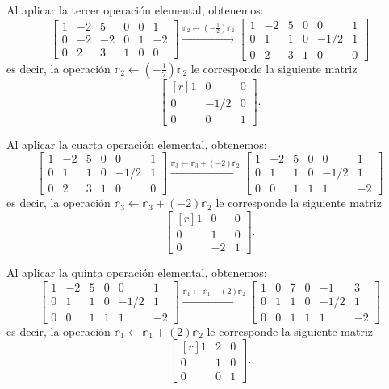 Al aplicar la tercer operación elemental, obtenemos:
$$\left[ \begin{array}{rrr|rrr}
    1 & -2 & 5 & 0 & 0 & 1 \\
    0 & -2 & -2 & 0 & 1 & -2 \\
    0 & 2 & 3 & 1 & 0 & 0
\end{array} \right] \xrightarrow{\mathbb{r}_2 \leftarrow (-\frac{1}{2}) \mathbb{r}_2} \left[ \begin{array}{rrr|rrr}
    1 & -2 & 5 & 0 & 0 & 1 \\
    0 & 1 & 1 & 0 & -1/2 & 1 \\
    0 & 2 & 3 & 1 & 0 & 0
\end{array} \right]$$
es decir, la operación $\mathbb{r}_2 \leftarrow (-\frac{1}{2}) \mathbb{r}_2$ le corresponde la siguiente matriz
$$\begin{bmatrix*}[r]
    1 & 0 & 0 \\
    0 & -1/2 & 0 \\
    0 & 0 & 1
\end{bmatrix*}.$$

Al aplicar la cuarta operación elemental, obtenemos:
$$\left[ \begin{array}{rrr|rrr}
    1 & -2 & 5 & 0 & 0 & 1 \\
    0 & 1 & 1 & 0 & -1/2 & 1 \\
    0 & 2 & 3 & 1 & 0 & 0
\end{array} \right] \xrightarrow{\mathbb{r}_3 \leftarrow \mathbb{r}_3 + (-2) \mathbb{r}_2} \left[ \begin{array}{rrr|rrr}
    1 & -2 & 5 & 0 & 0 & 1 \\
    0 & 1 & 1 & 0 & -1/2 & 1 \\
    0 & 0 & 1 & 1 & 1 & -2
\end{array} \right]$$
es decir, la operación $\mathbb{r}_3 \leftarrow \mathbb{r}_3 + (-2) \mathbb{r}_2$ le corresponde la siguiente matriz
$$\begin{bmatrix*}[r]
    1 & 0 & 0 \\
    0 & 1 & 0 \\
    0 & -2 & 1
\end{bmatrix*}.$$

Al aplicar la quinta operación elemental, obtenemos:
$$\left[ \begin{array}{rrr|rrr}
    1 & -2 & 5 & 0 & 0 & 1 \\
    0 & 1 & 1 & 0 & -1/2 & 1 \\
    0 & 0 & 1 & 1 & 1 & -2
\end{array} \right] \xrightarrow{\mathbb{r}_1 \leftarrow \mathbb{r}_1 + (2) \mathbb{r}_2} \left[ \begin{array}{rrr|rrr}
    1 & 0 & 7 & 0 & -1 & 3 \\
    0 & 1 & 1 & 0 & -1/2 & 1 \\
    0 & 0 & 1 & 1 & 1 & -2
\end{array} \right]$$
es decir, la operación $\mathbb{r}_1 \leftarrow \mathbb{r}_1 + (2) \mathbb{r}_2$ le corresponde la siguiente matriz
$$\begin{bmatrix*}[r]
    1 & 2 & 0 \\
    0 & 1 & 0 \\
    0 & 0 & 1
\end{bmatrix*}.$$\newpage


